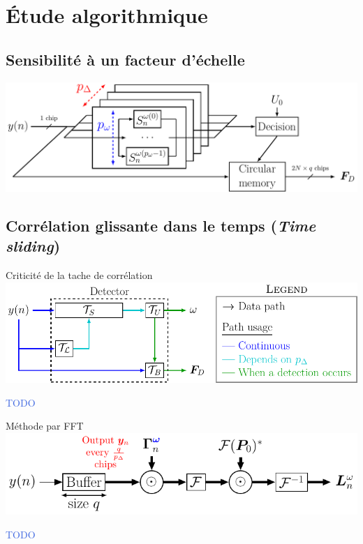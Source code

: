\documentclass[../main.tex]{subfiles}
\begin{document}
\section{Étude algorithmique}

\subsection{Sensibilité à un facteur d'échelle}


\begin{frame}{\subsecname}
  \begin{center}
    \includegraphics[width=.8\linewidth]{figures/tikzpicture/funct_view_detnorm_stdl.pdf}
  \end{center}
\end{frame}


\subsection{Corrélation glissante dans le temps (\emph{Time sliding})}

\begin{frame}{Criticité de la tache de corrélation}
  \includegraphics[width=\linewidth]{figures/tikzpicture/tasks_dep_stdl.pdf}
  \begin{center}
    \textcolor{RoyalBlue}{TODO}
  \end{center}
\end{frame}

\begin{frame}{Méthode par FFT}
  \centering
  \includegraphics[width=.6\linewidth, height=.7\textheight, keepaspectratio=true]{figures/tikzpicture/arch_fft_sync_stdl.pdf}
  \begin{center}
    \textcolor{RoyalBlue}{TODO}
  \end{center}
\end{frame}
\end{document}

